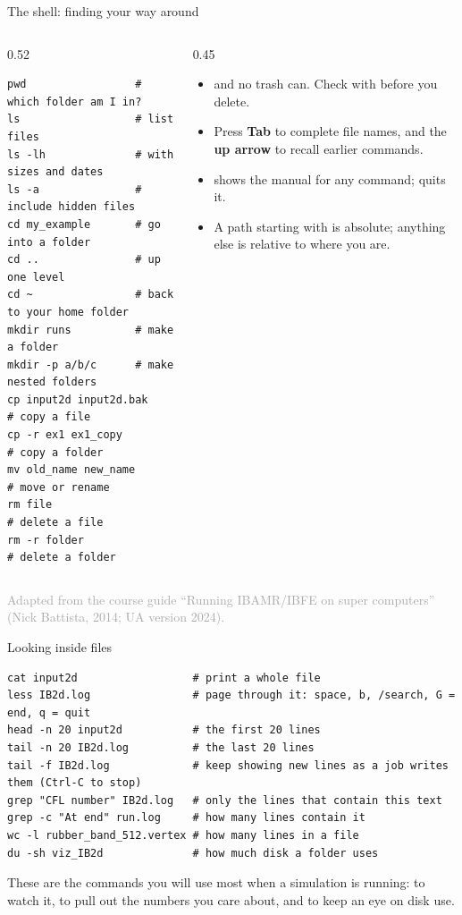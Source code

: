 \documentclass[aspectratio=169,11pt]{beamer}
\newcommand{\sourcecredit}[1]{\vfill\hfill{\tiny\textcolor{DarkGray}{#1}}}
\begin{document}
\begin{frame}[fragile]{The shell: finding your way around}
\begin{columns}[T,onlytextwidth]
\begin{column}{0.52\textwidth}
\begin{lstlisting}[style=shell]
pwd                 # which folder am I in?
ls                  # list files
ls -lh              # with sizes and dates
ls -a               # include hidden files
cd my_example       # go into a folder
cd ..               # up one level
cd ~                # back to your home folder
mkdir runs          # make a folder
mkdir -p a/b/c      # make nested folders
cp input2d input2d.bak     # copy a file
cp -r ex1 ex1_copy         # copy a folder
mv old_name new_name       # move or rename
rm file                    # delete a file
rm -r folder               # delete a folder
\end{lstlisting}
\end{column}
\begin{column}{0.45\textwidth}
\begin{itemize}\small
  \item {} and no trash can. Check with  before you delete.
  \item Press \textbf{Tab} to complete file names, and the \textbf{up arrow} to recall earlier commands.
  \item {} shows the manual for any command;  quits it.
  \item A path starting with \code{/} is absolute; anything else is relative to where you are.
\end{itemize}
\end{column}
\end{columns}
\sourcecredit{Adapted from the course guide ``Running IBAMR/IBFE on super computers'' (Nick Battista, 2014; UA version 2024).}
\end{frame}

\begin{frame}[fragile]{Looking inside files}
\begin{lstlisting}[style=shell]
cat input2d                  # print a whole file
less IB2d.log                # page through it: space, b, /search, G = end, q = quit
head -n 20 input2d           # the first 20 lines
tail -n 20 IB2d.log          # the last 20 lines
tail -f IB2d.log             # keep showing new lines as a job writes them (Ctrl-C to stop)
grep "CFL number" IB2d.log   # only the lines that contain this text
grep -c "At end" run.log     # how many lines contain it
wc -l rubber_band_512.vertex # how many lines in a file
du -sh viz_IB2d              # how much disk a folder uses
\end{lstlisting}
\begin{punchbox}
\small These are the commands you will use most when a simulation is running:  to watch it,  to pull out the numbers you care about, and  to keep an eye on disk use.
\end{punchbox}
\end{frame}
\end{document}

